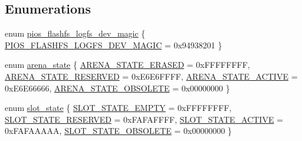 \subsection*{\-Enumerations}
\begin{DoxyCompactItemize}
\item 
enum \hyperlink{group___p_i_o_s___f_l_a_s_h_f_s_ga27472bb2a0fbfb6302378ef138c6a41f}{pios\-\_\-flashfs\-\_\-logfs\-\_\-dev\-\_\-magic} \{ \hyperlink{group___p_i_o_s___f_l_a_s_h_f_s_gga27472bb2a0fbfb6302378ef138c6a41fa48f1badb0700a4f00d8da2af591f701b}{\-P\-I\-O\-S\-\_\-\-F\-L\-A\-S\-H\-F\-S\-\_\-\-L\-O\-G\-F\-S\-\_\-\-D\-E\-V\-\_\-\-M\-A\-G\-I\-C} =  0x94938201
 \}
\item 
enum \hyperlink{group___p_i_o_s___f_l_a_s_h_f_s_gaa936149cfd5559190d20879c10e0fcee}{arena\-\_\-state} \{ \hyperlink{group___p_i_o_s___f_l_a_s_h_f_s_ggaa936149cfd5559190d20879c10e0fceea0868f5f69dae5f489f86f324fb2ec026}{\-A\-R\-E\-N\-A\-\_\-\-S\-T\-A\-T\-E\-\_\-\-E\-R\-A\-S\-E\-D} =  0x\-F\-F\-F\-F\-F\-F\-F\-F, 
\hyperlink{group___p_i_o_s___f_l_a_s_h_f_s_ggaa936149cfd5559190d20879c10e0fceeac20424e4b3a3a918490e8c307996fe7c}{\-A\-R\-E\-N\-A\-\_\-\-S\-T\-A\-T\-E\-\_\-\-R\-E\-S\-E\-R\-V\-E\-D} =  0x\-E6\-E6\-F\-F\-F\-F, 
\hyperlink{group___p_i_o_s___f_l_a_s_h_f_s_ggaa936149cfd5559190d20879c10e0fceea8bac821a323307ac4aa7b2de12f4896b}{\-A\-R\-E\-N\-A\-\_\-\-S\-T\-A\-T\-E\-\_\-\-A\-C\-T\-I\-V\-E} =  0x\-E6\-E66666, 
\hyperlink{group___p_i_o_s___f_l_a_s_h_f_s_ggaa936149cfd5559190d20879c10e0fceea3943698e7097dd06c6b54f71548d426e}{\-A\-R\-E\-N\-A\-\_\-\-S\-T\-A\-T\-E\-\_\-\-O\-B\-S\-O\-L\-E\-T\-E} =  0x00000000
 \}
\item 
enum \hyperlink{group___p_i_o_s___f_l_a_s_h_f_s_ga7df58e5fca7cec32767a0481da453e74}{slot\-\_\-state} \{ \hyperlink{group___p_i_o_s___f_l_a_s_h_f_s_gga7df58e5fca7cec32767a0481da453e74a3ec4030cfe6de3e15e9ce08f12c91734}{\-S\-L\-O\-T\-\_\-\-S\-T\-A\-T\-E\-\_\-\-E\-M\-P\-T\-Y} =  0x\-F\-F\-F\-F\-F\-F\-F\-F, 
\hyperlink{group___p_i_o_s___f_l_a_s_h_f_s_gga7df58e5fca7cec32767a0481da453e74acf379d22c045f40511eab34f8aafba5e}{\-S\-L\-O\-T\-\_\-\-S\-T\-A\-T\-E\-\_\-\-R\-E\-S\-E\-R\-V\-E\-D} =  0x\-F\-A\-F\-A\-F\-F\-F\-F, 
\hyperlink{group___p_i_o_s___f_l_a_s_h_f_s_gga7df58e5fca7cec32767a0481da453e74acf5fd7f439ede2b21808a3edc1acc4f4}{\-S\-L\-O\-T\-\_\-\-S\-T\-A\-T\-E\-\_\-\-A\-C\-T\-I\-V\-E} =  0x\-F\-A\-F\-A\-A\-A\-A\-A, 
\hyperlink{group___p_i_o_s___f_l_a_s_h_f_s_gga7df58e5fca7cec32767a0481da453e74aff81f83249791cda333bde0850150ccc}{\-S\-L\-O\-T\-\_\-\-S\-T\-A\-T\-E\-\_\-\-O\-B\-S\-O\-L\-E\-T\-E} =  0x00000000
 \}
\end{DoxyCompactItemize}
